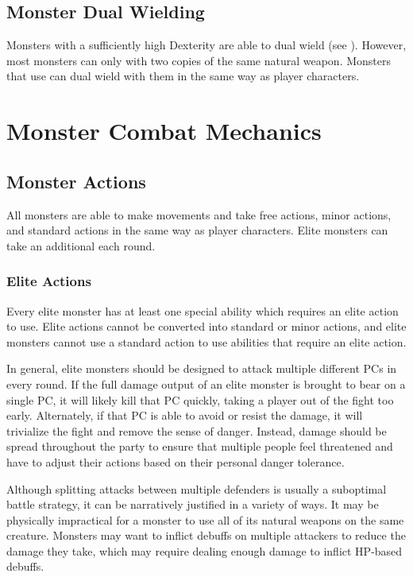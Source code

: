     \subsection{Monster Dual Wielding}\label{Monster Dual Wielding}
        Monsters with a sufficiently high Dexterity are able to dual wield (see ).
        However, most monsters can only  with two copies of the same  natural weapon.
        Monsters that use  can dual wield with them in the same way as player characters.

\section{Monster Combat Mechanics}

    \subsection{Monster Actions}\label{Monster Actions}
        All monsters are able to make movements and take free actions, minor actions, and standard actions in the same way as player characters.
        Elite monsters can take an additional  each round.

        \subsubsection{Elite Actions}\label{Elite Actions}
            Every elite monster has at least one special ability which requires an elite action to use.
            Elite actions cannot be converted into standard or minor actions, and elite monsters cannot use a standard action to use abilities that require an elite action.

            In general, elite monsters should be designed to attack multiple different PCs in every round.
            If the full damage output of an elite monster is brought to bear on a single PC, it will likely kill that PC quickly, taking a player out of the fight too early.
            Alternately, if that PC is able to avoid or resist the damage, it will trivialize the fight and remove the sense of danger.
            Instead, damage should be spread throughout the party to ensure that multiple people feel threatened and have to adjust their actions based on their personal danger tolerance.

            Although splitting attacks between multiple defenders is usually a suboptimal battle strategy, it can be narratively justified in a variety of ways.
            It may be physically impractical for a monster to use all of its natural weapons on the same creature.
            Monsters may want to inflict debuffs on multiple attackers to reduce the damage they take, which may require dealing enough damage to inflict HP-based debuffs.

